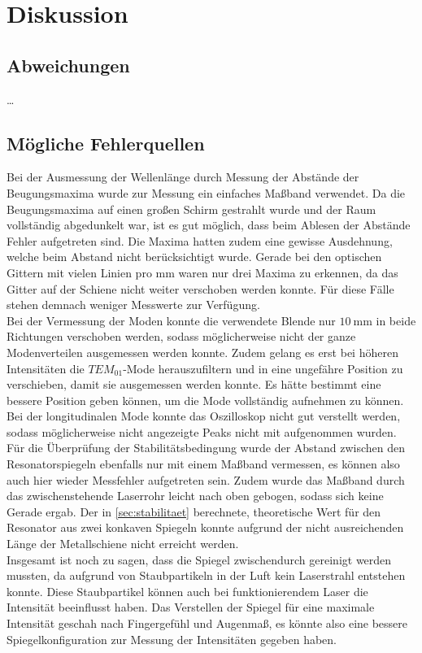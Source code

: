 \section{Diskussion}
\label{sec:diskussion}

\subsection{Abweichungen}

…


\subsection{Mögliche Fehlerquellen}

    Bei der Ausmessung der Wellenlänge durch Messung der Abstände der Beugungsmaxima wurde zur Messung ein einfaches Maßband verwendet.
    Da die Beugungsmaxima auf einen großen Schirm gestrahlt wurde und der Raum vollständig abgedunkelt war,
    ist es gut möglich,
    dass beim Ablesen der Abstände Fehler aufgetreten sind.
    Die Maxima hatten zudem eine gewisse Ausdehnung,
    welche beim Abstand nicht berücksichtigt wurde.
    Gerade bei den optischen Gittern mit vielen Linien pro $\si{\milli\meter}$ waren nur drei Maxima zu erkennen,
    da das Gitter auf der Schiene nicht weiter verschoben werden konnte.
    Für diese Fälle stehen demnach weniger Messwerte zur Verfügung.\\
    Bei der Vermessung der Moden konnte die verwendete Blende nur $\SI{10}{\milli\meter}$ in beide Richtungen verschoben werden,
    sodass möglicherweise nicht der ganze Modenverteilen ausgemessen werden konnte.
    Zudem gelang es erst bei höheren Intensitäten die $TEM_{01}$-Mode herauszufiltern und in eine ungefähre Position zu verschieben,
    damit sie ausgemessen werden konnte.
    Es hätte bestimmt eine bessere Position geben können,
    um die Mode vollständig aufnehmen zu können.
    Bei der longitudinalen Mode konnte das Oszilloskop nicht gut verstellt werden,
    sodass möglicherweise nicht angezeigte Peaks nicht mit aufgenommen wurden.\\
    Für die Überprüfung der Stabilitätsbedingung wurde der Abstand zwischen den Resonatorspiegeln ebenfalls nur mit einem Maßband vermessen,
    es können also auch hier wieder Messfehler aufgetreten sein.
    Zudem wurde das Maßband durch das zwischenstehende Laserrohr leicht nach oben gebogen,
    sodass sich keine Gerade ergab.
    Der in \autoref{sec:stabilitaet} berechnete,
    theoretische Wert für den Resonator aus zwei konkaven Spiegeln konnte aufgrund der nicht ausreichenden Länge der Metallschiene nicht erreicht werden.\\
    Insgesamt ist noch zu sagen,
    dass die Spiegel zwischendurch gereinigt werden mussten,
    da aufgrund von Staubpartikeln in der Luft kein Laserstrahl entstehen konnte.
    Diese Staubpartikel können auch bei funktionierendem Laser die Intensität beeinflusst haben.
    Das Verstellen der Spiegel für eine maximale Intensität geschah nach Fingergefühl und Augenmaß,
    es könnte also eine bessere Spiegelkonfiguration zur Messung der Intensitäten gegeben haben.
